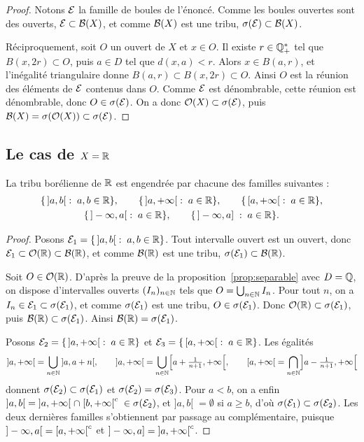 \documentclass[11pt]{article}
\begin{document}
\begin{proof}
Notons $\mathcal{E}$ la famille de boules de l'énoncé. Comme les boules ouvertes sont des ouverts, $\mathcal{E} \subset \mathcal{B}(X)$, et comme $\mathcal{B}(X)$ est une tribu, $\sigma(\mathcal{E}) \subset \mathcal{B}(X)$.

Réciproquement, soit $O$ un ouvert de $X$ et $x \in O$. Il existe $r \in \mathbb{Q}_+^*$ tel que $B(x,2r) \subset O$, puis $a \in D$ tel que $d(x,a) < r$. Alors $x \in B(a,r)$, et l'inégalité triangulaire donne $B(a,r) \subset B(x,2r) \subset O$. Ainsi $O$ est la réunion des éléments de $\mathcal{E}$ contenus dans $O$. Comme $\mathcal{E}$ est dénombrable, cette réunion est dénombrable, donc $O \in \sigma(\mathcal{E})$. On a donc $\mathcal{O}(X) \subset \sigma(\mathcal{E})$, puis $\mathcal{B}(X) = \sigma(\mathcal{O}(X)) \subset \sigma(\mathcal{E})$.
\end{proof}

\subsection*{Le cas de \texorpdfstring{$X = \mathbb{R}$}{X = R}}

\begin{proposition}\label{prop:generateurs}
La tribu borélienne de $\mathbb{R}$ est engendrée par chacune des familles suivantes :
\begin{gather*}
  \{\,]a,b[ \;:\; a,b \in \mathbb{R}\},\qquad
  \{\,]a,+\infty[ \;:\; a \in \mathbb{R}\},\qquad
  \{\,[a,+\infty[ \;:\; a \in \mathbb{R}\},\\
  \{\,]-\infty,a[ \;:\; a \in \mathbb{R}\},\qquad
  \{\,]-\infty,a] \;:\; a \in \mathbb{R}\}.
\end{gather*}
\end{proposition}

\begin{proof}
Posons $\mathcal{E}_1 = \{\,]a,b[ \;:\; a,b\in\mathbb{R}\}$. Tout intervalle ouvert est un ouvert, donc $\mathcal{E}_1 \subset \mathcal{O}(\mathbb{R}) \subset \mathcal{B}(\mathbb{R})$, et comme $\mathcal{B}(\mathbb{R})$ est une tribu, $\sigma(\mathcal{E}_1) \subset \mathcal{B}(\mathbb{R})$.

Soit $O \in \mathcal{O}(\mathbb{R})$. D'après la preuve de la proposition~\ref{prop:separable} avec $D = \mathbb{Q}$, on dispose d'intervalles ouverts $(I_n)_{n\in\mathbb{N}}$ tels que $O = \bigcup_{n\in\mathbb{N}} I_n$. Pour tout $n$, on a $I_n \in \mathcal{E}_1 \subset \sigma(\mathcal{E}_1)$, et comme $\sigma(\mathcal{E}_1)$ est une tribu, $O \in \sigma(\mathcal{E}_1)$. Donc $\mathcal{O}(\mathbb{R}) \subset \sigma(\mathcal{E}_1)$, puis $\mathcal{B}(\mathbb{R}) \subset \sigma(\mathcal{E}_1)$. Ainsi $\mathcal{B}(\mathbb{R}) = \sigma(\mathcal{E}_1)$.

Posons $\mathcal{E}_2 = \{\,]a,+\infty[ \;:\; a\in\mathbb{R}\}$ et $\mathcal{E}_3 = \{\,[a,+\infty[ \;:\; a\in\mathbb{R}\}$. Les égalités
\[
  ]a,+\infty[\; = \bigcup_{n\in\mathbb{N}}\, ]a,a+n[,
  \qquad
  ]a,+\infty[\; = \bigcup_{n\in\mathbb{N}} \Bigl[a+\tfrac{1}{n+1},+\infty\Bigr[,
  \qquad
  [a,+\infty[\; = \bigcap_{n\in\mathbb{N}} \Bigl]a-\tfrac{1}{n+1},+\infty\Bigr[
\]
donnent $\sigma(\mathcal{E}_2) \subset \sigma(\mathcal{E}_1)$ et $\sigma(\mathcal{E}_2) = \sigma(\mathcal{E}_3)$. Pour $a < b$, on a enfin $]a,b[\; = \;]a,+\infty[ \;\cap\; {[b,+\infty[}^{c}\; \in \sigma(\mathcal{E}_2)$, et $]a,b[\; = \emptyset$ si $a \geq b$, d'où $\sigma(\mathcal{E}_1) \subset \sigma(\mathcal{E}_2)$. Les deux dernières familles s'obtiennent par passage au complémentaire, puisque $]-\infty,a[\; = {[a,+\infty[}^{c}$ et $]-\infty,a] = {]a,+\infty[}^{c}$.
\end{proof}
\end{document}
